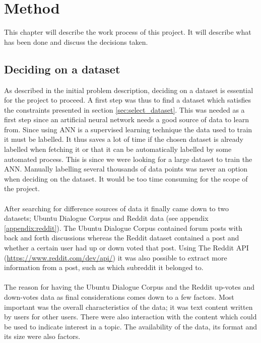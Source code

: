 \chapter{Method}\label{chap:method}
This chapter will describe the work process of this project. It will describe what has been done and discuss the decisions taken.

\section{Deciding on a dataset}\label{sec:deciding_dataset}
As described in the initial problem description, deciding on a dataset is essential for the project to proceed. A first step was thus to find a dataset which satisfies the constraints presented in section \ref{sec:select_dataset}. This was needed as a first step since an artificial neural network needs a good source of data to learn from. Since using ANN is a supervised learning technique the data used to train it must be labelled. It thus saves a lot of time if the chosen dataset is already labelled when fetching it or that it can be automatically labelled by some automated process. This is since we were looking for a large dataset to train the ANN. Manually labelling several thousands of data points was never an option when deciding on the dataset. It would be too time consuming for the scope of the project.
\\\\
After searching for difference sources of data it finally came down to two datasets; Ubuntu Dialogue Corpus \parencite{lowe2015ubuntu} and Reddit data (see appendix \ref{appendix:reddit}). The Ubuntu Dialogue Corpus contained forum posts with back and forth discussions whereas the Reddit dataset contained a post and whether a certain user had up or down voted that post. Using The Reddit API (\url{https://www.reddit.com/dev/api/}) it was also possible to extract more information from a post, such as which subreddit it belonged to.
\\\\
The reason for having the Ubuntu Dialogue Corpus and the Reddit up-votes and down-votes data as final considerations comes down to a few factors. Most important was the overall characteristics of the data; it was text content written by users for other users. There were also interaction with the content which could be used to indicate interest in a topic. The availability of the data, its format and its size were also factors.
\\\\

